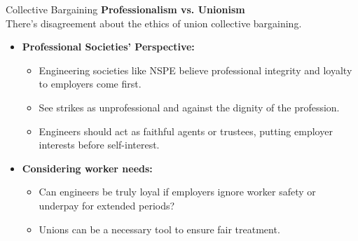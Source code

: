 \documentclass[11pt]{beamer}
\begin{document}
\begin{frame}[t,allowframebreaks]{Collective Bargaining}
        \textbf{Professionalism vs. Unionism}\\[5pt]
        There's disagreement about the ethics of union collective bargaining.\\[5pt]
        \begin{itemize}
            \item \textbf{Professional Societies' Perspective:}
            \begin{itemize}
                \item Engineering societies like NSPE believe professional integrity and loyalty to employers come
                first.
                \item See strikes as unprofessional and against the dignity of the profession.
                \item Engineers should act as faithful agents or trustees, putting employer interests before
                self-interest.
            \end{itemize}
            \item \textbf{Considering worker needs:}
            \begin{itemize}
                \item Can engineers be truly loyal if employers ignore worker safety or underpay for extended periods?
                \item Unions can be a necessary tool to ensure fair treatment.
            \end{itemize}
        \end{itemize}
%
%
    \end{frame}
\end{document}
